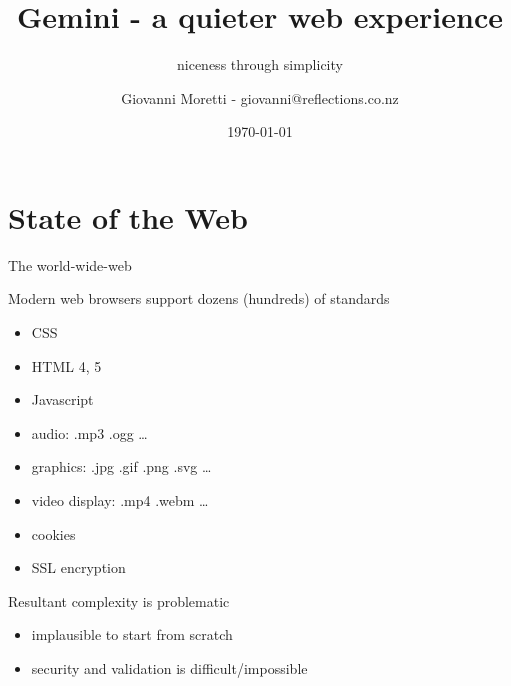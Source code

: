 \documentclass[presentation, 11pt,  aspectratio=169]{beamer}
\author{Giovanni Moretti - giovanni@reflections.co.nz}
\date{\today}
\title{Gemini - a quieter web experience}
\subtitle{niceness through simplicity}
\begin{document}
\maketitle

\section*{State of the Web}
\label{sec:orgfb4c9d1}
\begin{frame}[label={sec:orgb4256bb}]{The world-wide-web}
\begin{block}{Modern web browsers support dozens (hundreds) of standards}
\begin{itemize}
\item CSS\\
\item HTML 4, 5\\
\item Javascript\\
\item audio: .mp3 .ogg \ldots{}\\
\item graphics: .jpg .gif .png .svg \ldots{}\\
\item video display: .mp4 .webm \ldots{}\\
\item cookies\\
\item SSL encryption\\
\end{itemize}
\pause
\end{block}

\begin{block}{Resultant complexity is problematic}
\begin{itemize}
\item implausible to start from scratch\\
\item security and validation is difficult/impossible\\
\end{itemize}
\end{block}
\end{frame}
\end{document}
